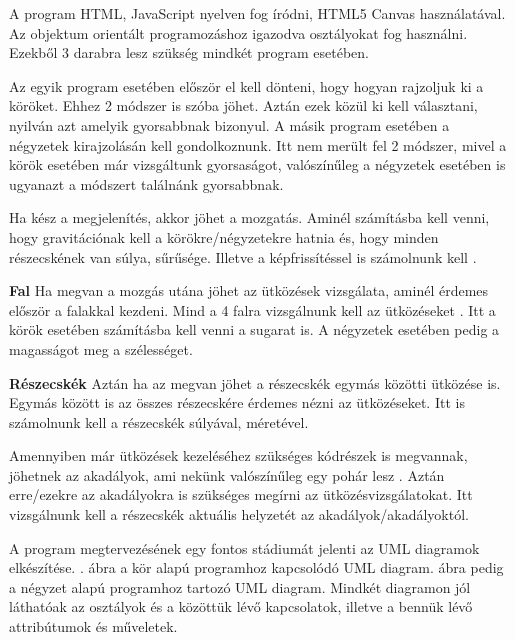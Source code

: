 

A program HTML, JavaScript nyelven fog íródni, HTML5 Canvas használatával. Az objektum orientált programozáshoz igazodva osztályokat fog használni. Ezekből 3 darabra lesz szükség mindkét program esetében. 


Az egyik program esetében először el kell dönteni, hogy hogyan rajzoljuk ki a köröket. Ehhez 2 módszer is szóba jöhet. Aztán ezek közül ki kell választani, nyilván azt amelyik gyorsabbnak bizonyul. 
A másik program esetében a négyzetek kirajzolásán kell gondolkoznunk. Itt nem merült fel 2 módszer, mivel a körök esetében már vizsgáltunk gyorsaságot, valószínűleg a négyzetek esetében is ugyanazt a módszert találnánk gyorsabbnak.


Ha kész a megjelenítés, akkor jöhet a mozgatás. Aminél számításba kell venni, hogy gravitációnak kell a körökre/négyzetekre hatnia  és, hogy minden részecskének van súlya, sűrűsége. Illetve a képfrissítéssel is számolnunk kell \cite{game}.



\textbf{Fal}
Ha megvan a mozgás utána jöhet az ütközések vizsgálata, aminél érdemes először a falakkal kezdeni. Mind a 4 falra vizsgálnunk kell az ütközéseket \cite{bounce}. Itt a körök esetében számításba kell venni a sugarat is. A négyzetek esetében pedig a magasságot meg a szélességet. 

\textbf{Részecskék}
Aztán ha az megvan jöhet a részecskék egymás közötti ütközése is. Egymás között is az összes részecskére érdemes nézni az ütközéseket. Itt is számolnunk kell a részecskék súlyával, méretével. 


Amennyiben már ütközések kezeléséhez szükséges kódrészek is megvannak, jöhetnek az akadályok, ami nekünk valószínűleg egy pohár lesz \cite{collision}. Aztán erre/ezekre az akadályokra is szükséges megírni az ütközésvizsgálatokat. Itt vizsgálnunk kell a részecskék aktuális helyzetét az akadályok/akadályoktól.



A program megtervezésének egy fontos stádiumát jelenti az UML diagramok elkészítése. . ábra a kör alapú programhoz kapcsolódó UML diagram.  ábra pedig a négyzet alapú programhoz tartozó UML diagram. Mindkét diagramon jól láthatóak az osztályok és a közöttük lévő kapcsolatok, illetve a bennük lévő attribútumok és műveletek.

